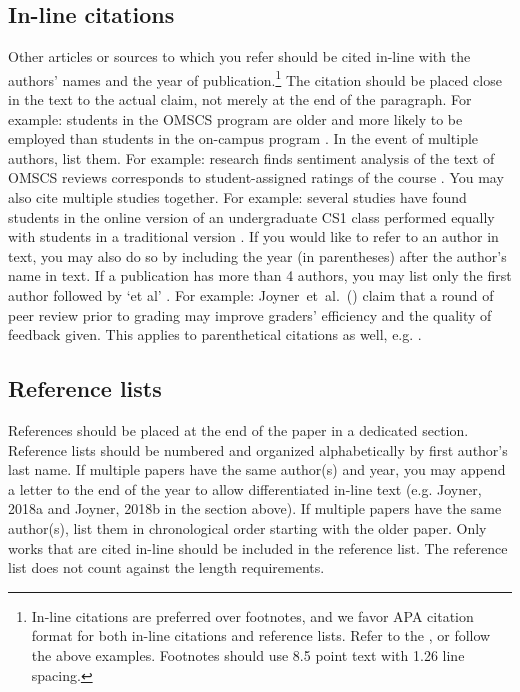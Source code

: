 {{{{\subsection{In-line citations}
Other articles or sources to which you refer should be cited in-line with the
authors' names and the year of publication.\footnote{In-line citations are preferred over footnotes, and we favor APA citation format for both in-line citations and reference lists. Refer to the , or follow the above examples. Footnotes should use 8.5 point text with 1.26 line spacing.
} The citation should be placed close
in the text to the actual claim, not merely at the end of the paragraph. For
example: students in the OMSCS program are older and more likely to be employed
than students in the on-campus program \citep{Joyner17}. In the event of
multiple authors, list them. For example: research finds sentiment analysis of
the text of OMSCS reviews corresponds to student-assigned ratings of the course
\citep{Newman18}. You may also cite multiple studies together. For example:
several studies have found students in the online version of an undergraduate
CS1 class performed equally with students in a traditional version
\citep{Joyner18a,Joyner18b,Joyner19}. If you would like to refer to an author in
text, you may also do so by including the year (in parentheses) after the
author's name in text. If a publication has more than 4 authors, you may list
only the first author followed by `et al' . For example:
Joyner~et~al.~(\citeyear{Joyner16}) claim that a round of peer review prior to
grading may improve graders' efficiency and the quality of feedback given. This
applies to parenthetical citations as well, e.g. \citep{Joyner16}.

\subsection{Reference lists}
References should be placed at the end of the paper in a dedicated section. Reference lists should be numbered and organized alphabetically by first author’s last name. If multiple papers have the same author(s) and year, you may append a letter to the end of the year to allow differentiated in-line text (e.g. Joyner, 2018a and Joyner, 2018b in the section above). If multiple papers have the same author(s), list them in chronological order starting with the older paper. Only works that are cited in-line should be included in the reference list. The reference list does not count against the length requirements.

}}}}
